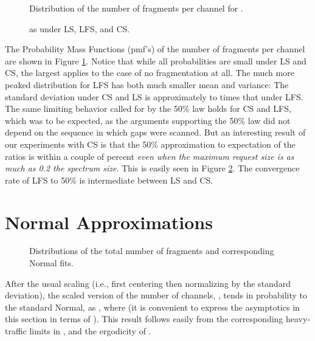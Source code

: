 \documentclass{amsart}
\begin{document}
\begin{figure}[!t]
\begin{center}
 \caption{Distribution of the number of fragments per channel for .}
 \label{dist-fragper}
\end{center}
\end{figure}


\begin{figure}[!t]
\begin{center}
 \caption{ 
 as  under LS, LFS, and CS.}
 \label{fifty-law-ls-cs}
\end{center}
\end{figure}
The Probability Mass Functions (pmf's) of the number of fragments per channel are shown in Figure \ref{dist-fragper}.
Notice that while all probabilities are small under LS and CS, the largest applies to the case of no fragmentation at all.  The much more peaked distribution for LFS has both  much smaller mean and variance:  The standard deviation under CS and LS is approximately  to  times that under LFS.
The same limiting behavior called for by the 50\% law holds for CS
and LFS, which was to be expected, as the arguments supporting the
50\% law did not depend on the sequence in which gaps were scanned.
But an interesting result of our experiments with CS is that the
50\% approximation to expectation of the ratios  is within a couple
of percent {\em even when the maximum request size is as much as 0.2
the spectrum size}. This is easily seen in Figure
\ref{fifty-law-ls-cs}.  The convergence rate of LFS to 50\% is intermediate between LS and CS.



\section{Normal Approximations}\label{sec:normal}

\begin{figure}[!t]
\begin{center}
  \caption{Distributions of the total number of fragments and corresponding Normal fits.}
  \label{normal-fits-num-frags}
\end{center}
\end{figure}
After the usual scaling (i.e.,
first centering then normalizing by the standard deviation), the
scaled version of the number of channels, , tends in
probability to the standard Normal,  as , where  (it is convenient to express the asymptotics in this section in terms
of ). This result follows easily from the
corresponding heavy-traffic limits in
\cite{CoffmanPuhalskiiReiman1991, CoffmanReiman1983}, and the
ergodicity of .
\end{document}
